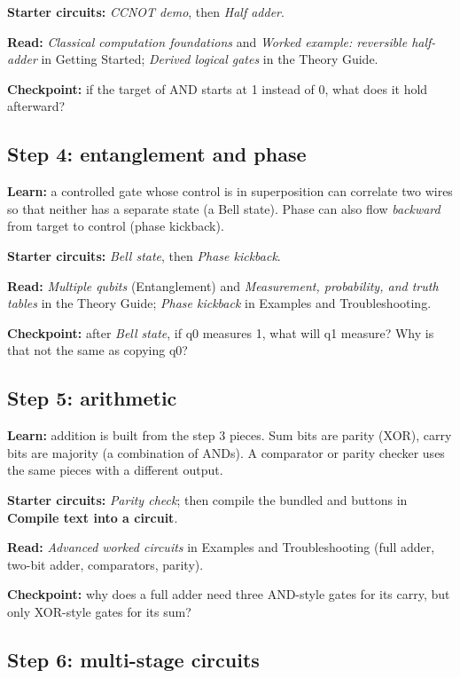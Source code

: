 \textbf{Starter circuits:} \emph{CCNOT demo}, then \emph{Half adder}.

\textbf{Read:} \emph{Classical computation foundations} and \emph{Worked
example: reversible half-adder} in Getting Started; \emph{Derived logical
gates} in the Theory Guide.

\textbf{Checkpoint:} if the target of AND starts at 1 instead of 0, what does
it hold afterward?

\subsection{Step 4: entanglement and phase}

\textbf{Learn:} a controlled gate whose control is in superposition can
correlate two wires so that neither has a separate state (a Bell state). Phase
can also flow \emph{backward} from target to control (phase kickback).

\textbf{Starter circuits:} \emph{Bell state}, then \emph{Phase kickback}.

\textbf{Read:} \emph{Multiple qubits} (Entanglement) and \emph{Measurement,
probability, and truth tables} in the Theory Guide; \emph{Phase kickback} in
Examples and Troubleshooting.

\textbf{Checkpoint:} after \emph{Bell state}, if q0 measures 1, what will q1
measure? Why is that not the same as copying q0?

\subsection{Step 5: arithmetic}

\textbf{Learn:} addition is built from the step 3 pieces. Sum bits are parity
(XOR), carry bits are majority (a combination of ANDs). A comparator or parity
checker uses the same pieces with a different output.

\textbf{Starter circuits:} \emph{Parity check}; then compile the bundled
 and  buttons in
\textbf{Compile text into a circuit}.

\textbf{Read:} \emph{Advanced worked circuits} in Examples and Troubleshooting
(full adder, two-bit adder, comparators, parity).

\textbf{Checkpoint:} why does a full adder need three AND-style gates for its
carry, but only XOR-style gates for its sum?

\subsection{Step 6: multi-stage circuits}


